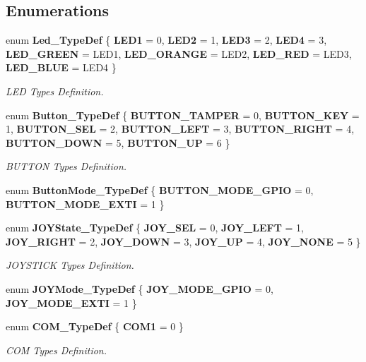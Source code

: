 \subsection*{Enumerations}
\begin{DoxyCompactItemize}
\item 
enum \textbf{ Led\+\_\+\+Type\+Def} \{ \newline
\textbf{ L\+E\+D1} = 0, 
\textbf{ L\+E\+D2} = 1, 
\textbf{ L\+E\+D3} = 2, 
\textbf{ L\+E\+D4} = 3, 
\newline
\textbf{ L\+E\+D\+\_\+\+G\+R\+E\+EN} = L\+E\+D1, 
\textbf{ L\+E\+D\+\_\+\+O\+R\+A\+N\+GE} = L\+E\+D2, 
\textbf{ L\+E\+D\+\_\+\+R\+ED} = L\+E\+D3, 
\textbf{ L\+E\+D\+\_\+\+B\+L\+UE} = L\+E\+D4
 \}
\begin{DoxyCompactList}\small\item\em L\+ED Types Definition. \end{DoxyCompactList}\item 
enum \textbf{ Button\+\_\+\+Type\+Def} \{ \newline
\textbf{ B\+U\+T\+T\+O\+N\+\_\+\+T\+A\+M\+P\+ER} = 0, 
\textbf{ B\+U\+T\+T\+O\+N\+\_\+\+K\+EY} = 1, 
\textbf{ B\+U\+T\+T\+O\+N\+\_\+\+S\+EL} = 2, 
\textbf{ B\+U\+T\+T\+O\+N\+\_\+\+L\+E\+FT} = 3, 
\newline
\textbf{ B\+U\+T\+T\+O\+N\+\_\+\+R\+I\+G\+HT} = 4, 
\textbf{ B\+U\+T\+T\+O\+N\+\_\+\+D\+O\+WN} = 5, 
\textbf{ B\+U\+T\+T\+O\+N\+\_\+\+UP} = 6
 \}
\begin{DoxyCompactList}\small\item\em B\+U\+T\+T\+ON Types Definition. \end{DoxyCompactList}\item 
enum \textbf{ Button\+Mode\+\_\+\+Type\+Def} \{ \textbf{ B\+U\+T\+T\+O\+N\+\_\+\+M\+O\+D\+E\+\_\+\+G\+P\+IO} = 0, 
\textbf{ B\+U\+T\+T\+O\+N\+\_\+\+M\+O\+D\+E\+\_\+\+E\+X\+TI} = 1
 \}
\item 
enum \textbf{ J\+O\+Y\+State\+\_\+\+Type\+Def} \{ \newline
\textbf{ J\+O\+Y\+\_\+\+S\+EL} = 0, 
\textbf{ J\+O\+Y\+\_\+\+L\+E\+FT} = 1, 
\textbf{ J\+O\+Y\+\_\+\+R\+I\+G\+HT} = 2, 
\textbf{ J\+O\+Y\+\_\+\+D\+O\+WN} = 3, 
\newline
\textbf{ J\+O\+Y\+\_\+\+UP} = 4, 
\textbf{ J\+O\+Y\+\_\+\+N\+O\+NE} = 5
 \}
\begin{DoxyCompactList}\small\item\em J\+O\+Y\+S\+T\+I\+CK Types Definition. \end{DoxyCompactList}\item 
enum \textbf{ J\+O\+Y\+Mode\+\_\+\+Type\+Def} \{ \textbf{ J\+O\+Y\+\_\+\+M\+O\+D\+E\+\_\+\+G\+P\+IO} = 0, 
\textbf{ J\+O\+Y\+\_\+\+M\+O\+D\+E\+\_\+\+E\+X\+TI} = 1
 \}
\item 
enum \textbf{ C\+O\+M\+\_\+\+Type\+Def} \{ \textbf{ C\+O\+M1} = 0
 \}
\begin{DoxyCompactList}\small\item\em C\+OM Types Definition. \end{DoxyCompactList}\end{DoxyCompactItemize}
